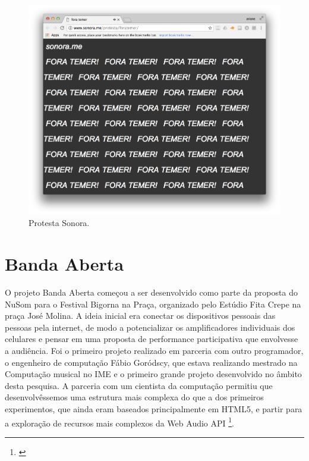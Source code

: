\begin{figure}
    \caption{\label{protesta}Protesta Sonora. }
    \begin{center}
    \includegraphics[width=1\linewidth]{pictures/cap3/protesta}
    \end{center}
\end{figure}



\section{Banda Aberta}

O projeto Banda Aberta começou a ser desenvolvido como parte da proposta do NuSom para o Festival Bigorna na Praça, organizado pelo Estúdio Fita Crepe na praça José Molina. A ideia inicial era conectar os dispositivos pessoais das pessoas pela internet, de modo a potencializar os amplificadores individuais dos celulares e pensar em uma proposta de performance participativa que envolvesse a audiência. Foi o primeiro projeto realizado em parceria com outro programador, o engenheiro de computação Fábio Goródscy, que estava realizando mestrado na Computação musical no IME e o primeiro grande projeto desenvolvido no âmbito desta pesquisa. A parceria com um cientista da computação permitiu que desenvolvêssemos uma estrutura mais complexa do que a dos primeiros experimentos, que ainda eram baseados principalmente em HTML5, e partir para a exploração de recursos mais complexos da Web Audio API \footnote{\cite{Adenot2015}}.

